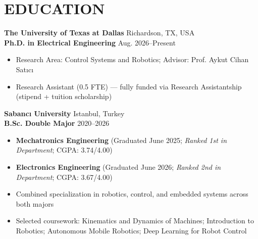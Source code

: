 \section*{EDUCATION}

\textbf{The University of Texas at Dallas} \hfill Richardson, TX, USA\\
\textbf{Ph.D. in Electrical Engineering} \hfill Aug. 2026--Present
\begin{itemize}
  \item Research Area: Control Systems and Robotics; Advisor: Prof. Aykut Cihan Satıcı
  \item Research Assistant (0.5 FTE) --- fully funded via Research Assistantship (stipend + tuition scholarship)
\end{itemize}
\entrysep

\textbf{Sabancı University} \hfill Istanbul, Turkey\\
\textbf{B.Sc. Double Major} \hfill 2020--2026
\begin{itemize}
  \item \textbf{Mechatronics Engineering} (Graduated June 2025; \textit{Ranked 1st in Department}; CGPA: 3.74/4.00)
  \item \textbf{Electronics Engineering} (Graduated June 2026; \textit{Ranked 2nd in Department}; CGPA: 3.67/4.00)
  \item Combined specialization in robotics, control, and embedded systems across both majors
  \item Selected coursework: Kinematics and Dynamics of Machines; Introduction to Robotics; Autonomous Mobile Robotics; Deep Learning for Robot Control
\end{itemize}
